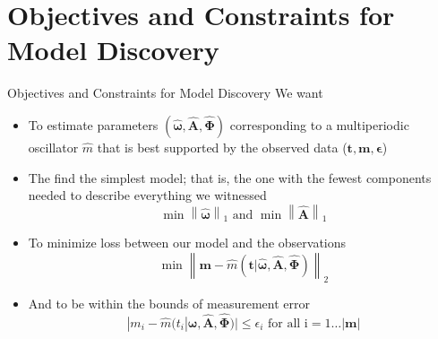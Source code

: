 \documentclass{beamer}
\begin{document}
\section{Objectives and Constraints for Model Discovery}
\begin{frame}{Objectives and Constraints for Model Discovery}
We want
\begin{itemize}
\item To estimate parameters $(\boldsymbol{\hat \omega}, \mathbf {\hat A}, \boldsymbol{\hat \Phi})$ corresponding to a multiperiodic oscillator $\hat m$ that is best supported by the observed data ($\mathbf{t}, \mathbf{m}, \boldsymbol \epsilon$) \pause 

\item The find the simplest model; that is, the one with the fewest components needed to describe everything we witnessed 
$$\min \left\| \boldsymbol{\hat \omega} \right\|_1 \text{ and } \min \left\| \mathbf{\hat{A}} \right\|_1$$ \pause

\item To minimize loss between our model and the observations
$$\min \left\| \mathbf m - \hat m(\mathbf t | \boldsymbol{\hat \omega}, \mathbf {\hat A}, \boldsymbol{\hat \Phi})\right\|_2$$ \pause

\item And to be within the bounds of measurement error
$$|m_i - \hat m(t_i | \boldsymbol{\hat \omega}, \mathbf {\hat A}, \boldsymbol{\hat \Phi})| \leq \epsilon_i \text{ for all i}=1\ldots |\mathbf{m}| $$

\end{itemize}
\end{frame}
\end{document}

